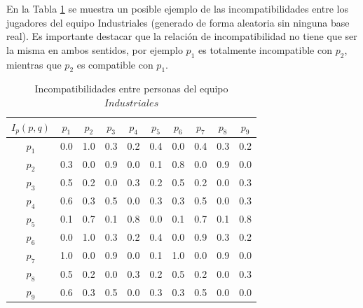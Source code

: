 En la Tabla \ref{iep-pel} se muestra un posible ejemplo de las incompatibilidades entre los jugadores del equipo Industriales (generado de forma aleatoria sin ninguna base real). Es importante destacar que la relación de incompatibilidad no tiene que ser la misma en ambos sentidos, por ejemplo $p_1$  es totalmente incompatible con $p_2$, mientras que $p_2$ es compatible con $p_1$.
		
\begin{table}[H]
	\centering
	\caption{Incompatibilidades entre personas del equipo $Industriales$}\label{iep-pel}
	\begin{tabular}{|c|c|c|c|c|c|c|c|c|c|}
		\hline
		$I_p(p,q)$ & $p_1$ & $p_2$ & $p_3$  & $p_4$ & $p_5$ & $p_6$ & $p_7$ & $p_8$  & $p_9$ \\ \hline
		$p_1$ 	& 0.0 & 1.0 & 0.3 & 0.2 & 0.4 & 0.0 & 0.4 & 0.3 & 0.2 \\ \hline
		$p_2$  	& 0.3 & 0.0 & 0.9 & 0.0 & 0.1 & 0.8 & 0.0 & 0.9 & 0.0 \\ \hline
		$p_3$ 	& 0.5 & 0.2 & 0.0 & 0.3 & 0.2 & 0.5 & 0.2 & 0.0 & 0.3 \\ \hline
		$p_4$ 	& 0.6 & 0.3 & 0.5 & 0.0 & 0.3 & 0.3 & 0.5 & 0.0 & 0.3 \\ \hline
		$p_5$ 	& 0.1 & 0.7 & 0.1 & 0.8 & 0.0 & 0.1 & 0.7 & 0.1 & 0.8 \\ \hline
		$p_6$ 	& 0.0 & 1.0 & 0.3 & 0.2 & 0.4 & 0.0 & 0.9 & 0.3 & 0.2 \\ \hline
		$p_7$  	& 1.0 & 0.0 & 0.9 & 0.0 & 0.1 & 1.0 & 0.0 & 0.9 & 0.0 \\ \hline
		$p_8$ 	& 0.5 & 0.2 & 0.0 & 0.3 & 0.2 & 0.5 & 0.2 & 0.0 & 0.3 \\ \hline
		$p_9$ 	& 0.6 & 0.3 & 0.5 & 0.0 & 0.3 & 0.3 & 0.5 & 0.0 & 0.0 \\ \hline
	\end{tabular}
\end{table}



